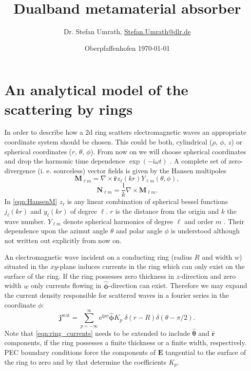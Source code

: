 \documentclass[a4paper,12pt]{scrartcl}  %
\title{Dualband metamaterial absorber}
\author[1]{Dr. Stefan Umrath, \href{mailto:Stefan.Umrath@dlr.de}{Stefan.Umrath@dlr.de}}
\affil[1]{German Aerospace Center (DLR)}
\date{Oberpfaffenhofen \today{} \vspace{3cm}}
\newcommand{\unitv}[1]{\hat{\bm{#1}}}
\newcommand{\imag}{\mathrm{i}}
\begin{document}
%



\section{An analytical model of the scattering by rings}
\label{sec:analytical_ring_scattering}

In order to describe how a 2d ring scatters electromagnetic waves an appropriate coordinate system should be chosen. This could be both, cylindrical ($\rho$, $\phi$, $z$) or spherical coordinates ($r$, $\theta$, $\phi$). From now on we will choose spherical coordinates and drop the harmonic time dependence $\exp(-\imag \omega t)$ . A complete set of zero-divergence (i. e. sourceless) vector fields is given by the Hansen multipoles \Cite{Hansen1935} 
\begin{equation}
\mathbf{M}_{\ell m} = \nabla \times \unitv{r} z_\ell(kr) Y_{\ell m}(\theta, \phi),
\label{eqn:HansenM}
\end{equation}
\begin{equation}
\mathbf{N}_{\ell m} = \frac{1}{k}\nabla \times \mathbf{M}_{\ell m}.
\label{eqn:HansenN}
\end{equation}
In \cref{eqn:HansenM} $z_\ell$ is any linear combination of spherical bessel functions $j_\ell(kr)$ and $y_\ell(kr)$ \Cite{DLMF_Bessel} of degree $\ell$. $r$ is the distance from the origin and $k$ the wave number. $Y_{\ell m}$ denote spherical harmonics of degree $\ell$ and order $m$ \Cite{DLMF_SphericalHarmonics}. Their dependence upon the azimut angle $\theta$ and polar angle $\phi$ is understood although not written out explicitly from now on.

An electromagnetic wave incident on a conducting ring (radius $R$ and width $w$) situated in the $xy$-plane induces currents in the ring which can only exist on the surface of the ring. If the ring possesses zero thickness in $z$-direction and zero width $w$ only currents flowing in $\unitv{\phi}$-direction can exist. Therefore we may expand the current density responsible for scattered waves in a fourier series in the coordinate $\phi$:
\begin{equation}
\mathbf{j}^\text{scat} = \sum_{p=-\infty}^\infty \mathrm{e}^{\imag p \phi} \unitv{\phi}K_p\; \delta(r-R) \delta(\theta-\pi/2) .
\label{eqn:ring_currents}
\end{equation}
Note that \cref{eqn:ring_currents} needs to be extended to include $\unitv{\theta}$ and $\unitv{r}$ components, if the ring possesses a finite thickness or a finite width, respectively. PEC boundary conditions force the components of $\mathbf{E}$ tangential to the surface of the ring to zero and by that determine the coefficients $K_p$.
\end{document}
